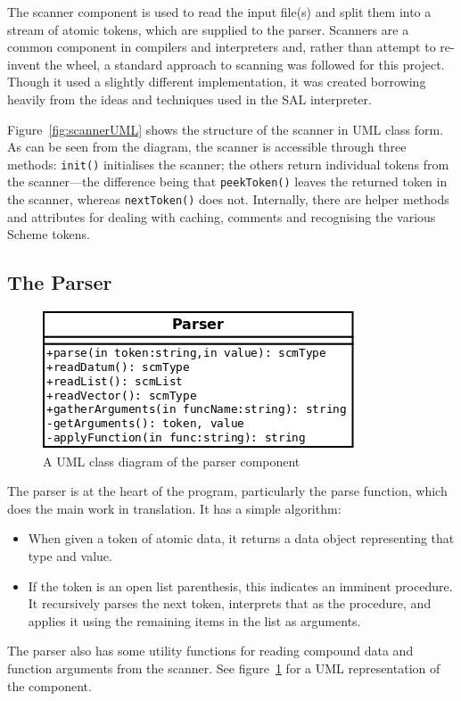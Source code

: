 The scanner component is used to read the input file(s) and split them into a
stream of atomic tokens, which are supplied to the parser. Scanners are a common
component in compilers and interpreters and, rather than attempt to re-invent
the wheel, a standard approach to scanning was followed for this project.
Though it used a slightly different implementation, it was created borrowing
heavily from the ideas and techniques used in the SAL interpreter\cite{sal}.

Figure~\ref{fig:scannerUML} shows the structure of the scanner in UML class
form. As can be seen from the diagram, the scanner is accessible through three
methods: \texttt{init()} initialises the scanner; the others return individual
tokens from the scanner---the difference being that \texttt{peekToken()} leaves
the returned token in the scanner, whereas \texttt{nextToken()} does not.
Internally, there are helper methods and attributes for dealing with caching,
comments and recognising the various Scheme tokens.

\subsection{The Parser}

\begin{figure}
\centering
\includegraphics[width=\textwidth]{parserUML.png}
\caption{A UML class diagram of the parser component}
\label{fig:parserUML}
\end{figure}

The parser is at the heart of the program, particularly the parse function,
which does the main work in translation. It has a simple algorithm:
\begin{itemize}
\item When given a token of atomic data, it returns a data object representing
that type and value.
\item If the token is an open list parenthesis, this indicates an imminent
procedure. It recursively parses the next token, interprets that as the
procedure, and applies it using the remaining items in the list as arguments.
\end{itemize}
The parser also has some utility functions for reading compound data and
function arguments from the scanner. See figure~\ref{fig:parserUML} for a UML
representation of the component.

